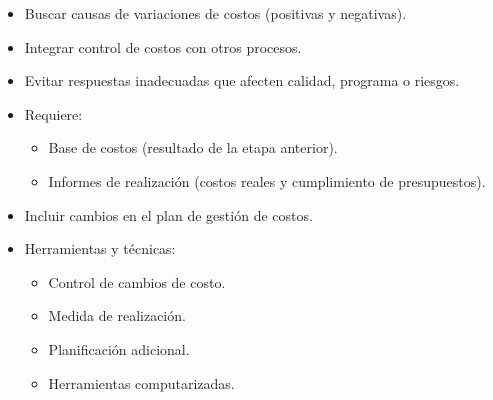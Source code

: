 \documentclass{article} %
\begin{document}
\begin{itemize}[label={},left=0pt,align=parleft]
    \item \begin{highlightbox}[levelone] Buscar causas de variaciones de costos (positivas y negativas). \end{highlightbox}
    \item \begin{highlightbox}[levelone] Integrar control de costos con otros procesos. \end{highlightbox}
    \item \begin{highlightbox}[levelone] Evitar respuestas inadecuadas que afecten calidad, programa o riesgos. \end{highlightbox}
    \item \begin{highlightbox}[levelone] Requiere: \end{highlightbox}
    \begin{itemize}[label={},left=1em,align=parleft]
        \item \begin{highlightbox}[leveltwo] Base de costos (resultado de la etapa anterior). \end{highlightbox}
        \item \begin{highlightbox}[leveltwo] Informes de realización (costos reales y cumplimiento de presupuestos). \end{highlightbox}
    \end{itemize}
    \item \begin{highlightbox}[levelone] Incluir cambios en el plan de gestión de costos. \end{highlightbox}
    \item \begin{highlightbox}[levelone] Herramientas y técnicas: \end{highlightbox}
    \begin{itemize}[label={},left=1em,align=parleft]
        \item \begin{highlightbox}[leveltwo] Control de cambios de costo. \end{highlightbox}
        \item \begin{highlightbox}[leveltwo] Medida de realización. \end{highlightbox}
        \item \begin{highlightbox}[leveltwo] Planificación adicional. \end{highlightbox}
        \item \begin{highlightbox}[leveltwo] Herramientas computarizadas. \end{highlightbox}
    \end{itemize}
\end{itemize}
\end{document}
